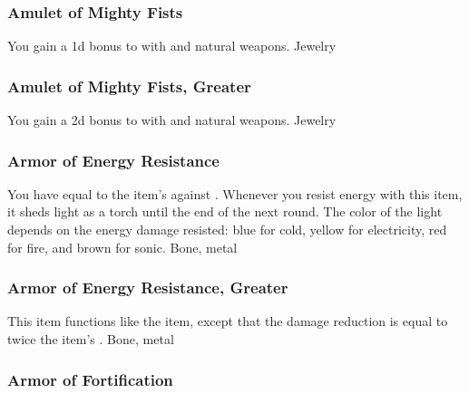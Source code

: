 \lowercase{\hypertarget{item:Amulet of Mighty Fists}{}}\label{item:Amulet of Mighty Fists}
\hypertarget{item:Amulet of Mighty Fists}{\subsubsection{Amulet of Mighty Fists\hfill{}}}
You gain a \plus1d bonus to  with  and natural weapons.
 
 Jewelry
\lowercase{\hypertarget{item:Amulet of Mighty Fists, Greater}{}}\label{item:Amulet of Mighty Fists, Greater}
\hypertarget{item:Amulet of Mighty Fists, Greater}{\subsubsection{Amulet of Mighty Fists, Greater\hfill{}}}
You gain a \plus2d bonus to  with  and natural weapons.
 
 Jewelry
\lowercase{\hypertarget{item:Armor of Energy Resistance}{}}\label{item:Armor of Energy Resistance}
\hypertarget{item:Armor of Energy Resistance}{\subsubsection{Armor of Energy Resistance\hfill{}}}
You have  equal to the item's  against .
Whenever you resist energy with this item, it sheds light as a torch until the end of the next round.
The color of the light depends on the energy damage resisted: blue for cold, yellow for electricity, red for fire, and brown for sonic.
 
 Bone, metal
\lowercase{\hypertarget{item:Armor of Energy Resistance, Greater}{}}\label{item:Armor of Energy Resistance, Greater}
\hypertarget{item:Armor of Energy Resistance, Greater}{\subsubsection{Armor of Energy Resistance, Greater\hfill{}}}
This item functions like the  item, except that the damage reduction is equal to twice the item's .
 
 Bone, metal
\lowercase{\hypertarget{item:Armor of Fortification}{}}\label{item:Armor of Fortification}
\hypertarget{item:Armor of Fortification}{\subsubsection{Armor of Fortification\hfill{}}}
